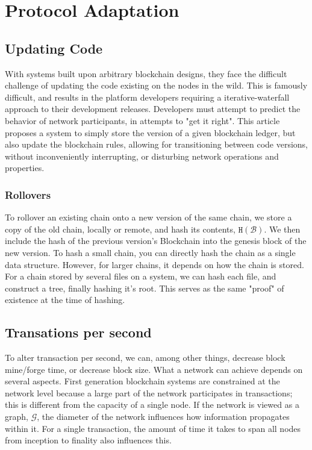 \documentclass[12pt, titlepage, twocolumn]{report}
\begin{document}
\chapter{Protocol Adaptation}

\section{Updating Code}
With systems built upon arbitrary blockchain designs, they face the difficult challenge of updating the code existing on the nodes in the wild. This is famously difficult, and results in the platform developers requiring a iterative-waterfall approach to their development releases. Developers must attempt to predict the behavior of network participants, in attempts to "get it right". This article proposes a system to simply store the version of a given blockchain ledger, but also update the blockchain rules, allowing for transitioning between code versions, without inconveniently interrupting, or disturbing network operations and properties.  


\subsection{Rollovers}
To rollover an existing chain onto a new version of the same chain, we store a copy of the old chain, locally or remote, and hash its contents, \(\texttt{H}(\boldsymbol{\mathcal{B}})\). We then include the hash of the previous version's Blockchain into the genesis block of the new version. To hash a small chain, you can directly hash the chain as a single data structure. However, for larger chains, it depends on how the chain is stored. For a chain stored by several files on a system, we can hash each file, and construct a tree, finally hashing it's root. This serves as the same "proof" of existence at the time of hashing.


\section{Transations per second}
To alter transaction per second, we can, among other things, decrease block mine/forge time, or decrease block size. What a network can achieve depends on several aspects. First generation blockchain systems are constrained at the network level because a large part of the network participates in transactions; this is different from the capacity of a single node. If the network is viewed as a graph, \(\mathcal{G}\), the diameter of the network influences how information propagates within it. For a single transaction, the amount of time it takes to span all nodes from inception to finality also influences this.
\end{document}
